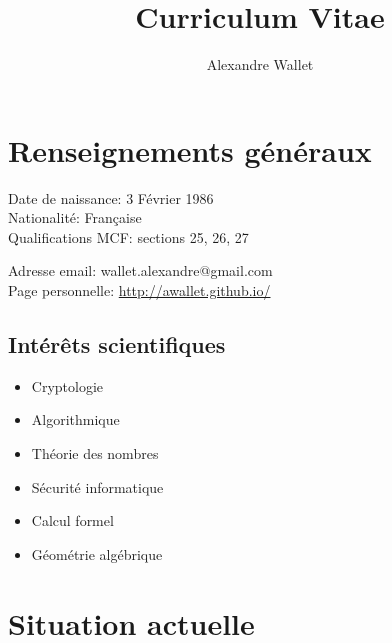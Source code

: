 \documentclass[11pt]{article}
\title{Curriculum Vitae}
\author{Alexandre Wallet}
\date{}
\begin{document}
\maketitle
\tableofcontents

\section{Renseignements généraux}
\begin{multicols}{2}
\noindent Date de naissance: 3 Février 1986\\
Nationalité: Française\\[10pt]
Qualifications MCF: sections 25, 26, 27

\noindent Adresse email: wallet.alexandre@gmail.com\\
Page personnelle: {\footnotesize \url{http://awallet.github.io/}}\\

\end{multicols}

\subsection*{Intérêts scientifiques}

\begin{multicols}{2}
  \begin{itemize}
  \item Cryptologie
  \item Algorithmique
  \item Théorie des nombres
  \item Sécurité informatique
  \item Calcul formel
  \item Géométrie algébrique
  \end{itemize}
\end{multicols}
  

\section*{Situation actuelle}
\end{document}
